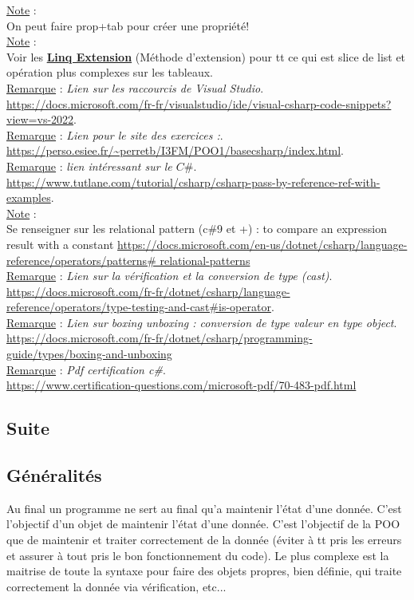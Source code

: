 \documentclass[a4paper,12pt,twoside]{article}
\newcommand{\urlcolor}{magenta}  %
\newcommand{\keycolor}{purple} %
\newcommand{\incode}[1]{{\footnotesize\ttfamily #1}} %
\newcommand{\rem}[2]{\noindent\underline{Remarque} : \textit{#1}.\\ \indent #2}
\newcommand{\note}[1]{\noindent\underline{Note} : \\ \indent #1}
\newcommand{\keyref}[2]{\hypersetup{urlcolor=\keycolor} \href{#1}{\textbf{#2}}\hypersetup{urlcolor=\urlcolor}}
\begin{document}
\note{On peut faire prop+tab pour créer une propriété!}\\

\note{Voir les \keyref{https://docs.microsoft.com/fr-fr/dotnet/csharp/programming-guide/classes-and-structs/extension-methods}{Linq Extension} (Méthode d'extension) pour tt ce qui est slice de \incode{list} et opération plus complexes sur les tableaux.}\\

\rem{Lien sur les raccourcis de Visual Studio}{\url{https://docs.microsoft.com/fr-fr/visualstudio/ide/visual-csharp-code-snippets?view=vs-2022}.}\\

\rem{Lien pour le site des exercices :}{\url{https://perso.esiee.fr/~perretb/I3FM/POO1/basecsharp/index.html}.}\\

\rem{lien intéressant sur le $C\#$}{ \url{https://www.tutlane.com/tutorial/csharp/csharp-pass-by-reference-ref-with-examples}.}\\

\note{Se renseigner sur les relational pattern (c\#9 et +) : to compare an expression result with a constant \url{https://docs.microsoft.com/en-us/dotnet/csharp/language-reference/operators/patterns\# relational-patterns}}\\

\rem{Lien sur la vérification et la conversion de type (cast)}{\url{https://docs.microsoft.com/fr-fr/dotnet/csharp/language-reference/operators/type-testing-and-cast\#is-operator}.}\\

\rem{Lien sur boxing unboxing : conversion de type valeur en type object}{\url{https://docs.microsoft.com/fr-fr/dotnet/csharp/programming-guide/types/boxing-and-unboxing}}\\

\rem{Pdf certification c\#}{\url{https://www.certification-questions.com/microsoft-pdf/70-483-pdf.html}}\\

\subsection{Suite}

\subsection{Généralités}

Au final un programme ne sert au final qu'a maintenir l'état d'une donnée. C'est l'objectif d'un objet de maintenir l'état d'une donnée. C'est l'objectif de la POO que de maintenir et traiter correctement de la donnée (éviter à tt pris les erreurs et assurer à tout pris le bon fonctionnement du code). Le plus complexe est la maitrise de toute la syntaxe pour faire des objets propres, bien définie, qui traite correctement la donnée via vérification, etc...\\
\end{document}
